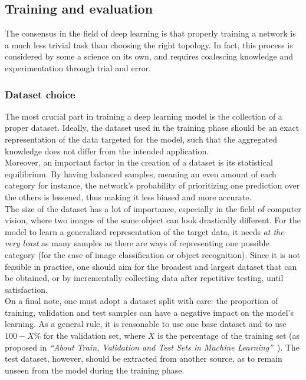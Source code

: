 \subsection{Training and evaluation}

The consensus in the field of deep learning is that properly training a network
is a much less trivial task than choosing the right topology. In fact, this
process is considered by some a science on its own, and requires coalescing
knowledge and experimentation through trial and error.

	\subsubsection{Dataset choice}

The most crucial part in training a deep learning model is the collection of a
proper dataset. Ideally, the dataset used in the training phase should be an
exact representation of the data targeted for the model, such that the
aggregated knowledge does not differ from the intended application.\\

Moreover, an important factor in the creation of a dataset is its statistical
equilibrium. By having balanced samples, meaning an even amount of each
category for instance, the network's probability of prioritizing one prediction
over the others is lessened, thus making it less biased and more accurate.\\

The size of the dataset has a lot of importance, especially in the
field of computer vision, where two images of the same object can look
drastically different. For the model to learn a generalized representation of
the target data, it needs \emph{at the very least} as many samples as
there are ways of representing one possible category (for the case of image
classification or object recognition). Since it is not feasible in practice,
one should aim for the broadest and largest dataset that can be obtained, or
by incrementally collecting data after repetitive testing, until
satisfaction.\\

On a final note, one must adopt a dataset split with care: the proportion of
training, validation and test samples can have a negative impact on the 
model's learning. As a general rule, it is reasonable to use one base dataset
and to use $100-X\%$ for the validation set, where $X$ is the percentage of the
training set (as proposed in \emph{``About Train, Validation and Test Sets in Machine
Learning''}~\cite{DatasetSplitting}). The test dataset, however, should be
extracted from another source, as to remain unseen from the model during the
training phase.

